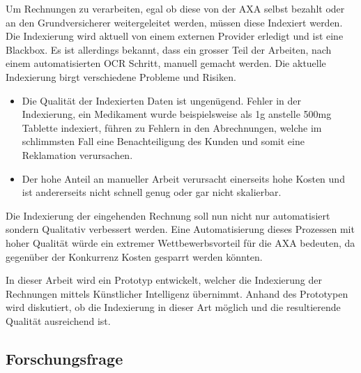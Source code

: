 \documentclass[12pt, twoside, table]{extarticle}
\begin{document}
Um Rechnungen zu verarbeiten, egal ob diese von der AXA selbst bezahlt oder an den Grundversicherer weitergeleitet werden, müssen diese Indexiert werden. Die Indexierung wird aktuell von einem externen Provider erledigt und ist eine Blackbox. Es ist allerdings bekannt, dass ein grosser Teil der Arbeiten, nach einem automatisierten OCR Schritt, manuell gemacht werden. Die aktuelle Indexierung birgt verschiedene Probleme und Risiken. 

\begin{itemize}
    \item Die Qualität der Indexierten Daten ist ungenügend. Fehler in der Indexierung, ein Medikament wurde beispielsweise als 1g anstelle 500mg Tablette indexiert, führen zu Fehlern in den Abrechnungen, welche im schlimmsten Fall eine Benachteiligung des Kunden und somit eine Reklamation verursachen. 
    \item Der hohe Anteil an manueller Arbeit verursacht einerseits hohe Kosten und ist andererseits nicht schnell genug oder gar nicht skalierbar.
\end{itemize}

Die Indexierung der eingehenden Rechnung soll nun nicht nur automatisiert sondern Qualitativ verbessert werden. Eine Automatisierung dieses Prozessen mit hoher Qualität würde ein extremer Wettbewerbsvorteil für die AXA bedeuten, da gegenüber der Konkurrenz Kosten gesparrt werden könnten.  

In dieser Arbeit wird ein Prototyp entwickelt, welcher die Indexierung der Rechnungen mittels Künstlicher Intelligenz übernimmt. Anhand des Prototypen wird diskutiert, ob die Indexierung in dieser Art möglich und die resultierende Qualität ausreichend ist.

\subsection{Forschungsfrage}


\newpage

\end{document}

